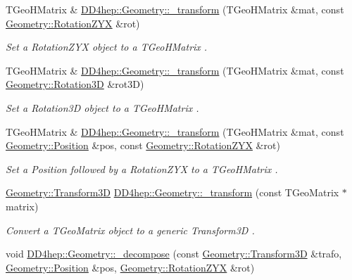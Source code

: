 \begin{DoxyCompactItemize}
T\+Geo\+H\+Matrix \& \hyperlink{group___d_d4_h_e_p___g_e_o_m_e_t_r_y_gae00745e30557512fe1da42fc705d42d1}{D\+D4hep\+::\+Geometry\+::\+\_\+transform} (T\+Geo\+H\+Matrix \&mat, const \hyperlink{namespace_d_d4hep_1_1_geometry_a24667b2b9c3cec3d5239828db4d52189}{Geometry\+::\+Rotation\+Z\+YX} \&rot)
\begin{DoxyCompactList}\small\item\em Set a Rotation\+Z\+YX object to a T\+Geo\+H\+Matrix . \end{DoxyCompactList}\item 
T\+Geo\+H\+Matrix \& \hyperlink{group___d_d4_h_e_p___g_e_o_m_e_t_r_y_ga249607824f27e539ae7a6d93d367afc6}{D\+D4hep\+::\+Geometry\+::\+\_\+transform} (T\+Geo\+H\+Matrix \&mat, const \hyperlink{namespace_d_d4hep_1_1_geometry_a022fecb763315fa2bf39cbb648944a0e}{Geometry\+::\+Rotation3D} \&rot3D)
\begin{DoxyCompactList}\small\item\em Set a Rotation3D object to a T\+Geo\+H\+Matrix . \end{DoxyCompactList}\item 
T\+Geo\+H\+Matrix \& \hyperlink{group___d_d4_h_e_p___g_e_o_m_e_t_r_y_ga71170881a8a2e3803a68f7e55d237188}{D\+D4hep\+::\+Geometry\+::\+\_\+transform} (T\+Geo\+H\+Matrix \&mat, const \hyperlink{namespace_d_d4hep_1_1_geometry_a55083902099d03506c6db01b80404900}{Geometry\+::\+Position} \&pos, const \hyperlink{namespace_d_d4hep_1_1_geometry_a24667b2b9c3cec3d5239828db4d52189}{Geometry\+::\+Rotation\+Z\+YX} \&rot)
\begin{DoxyCompactList}\small\item\em Set a Position followed by a Rotation\+Z\+YX to a T\+Geo\+H\+Matrix . \end{DoxyCompactList}\item 
\hyperlink{namespace_d_d4hep_1_1_geometry_aeb4c0356d12fd7be49a0aae50514e64b}{Geometry\+::\+Transform3D} \hyperlink{group___d_d4_h_e_p___g_e_o_m_e_t_r_y_ga7d9b7297bf0cee38d702a6e460a030a1}{D\+D4hep\+::\+Geometry\+::\+\_\+transform} (const T\+Geo\+Matrix $\ast$matrix)
\begin{DoxyCompactList}\small\item\em Convert a T\+Geo\+Matrix object to a generic Transform3D . \end{DoxyCompactList}\item 
void \hyperlink{group___d_d4_h_e_p___g_e_o_m_e_t_r_y_ga9bb962c6fc39a0f8fc76420e08d24c7a}{D\+D4hep\+::\+Geometry\+::\+\_\+decompose} (const \hyperlink{namespace_d_d4hep_1_1_geometry_aeb4c0356d12fd7be49a0aae50514e64b}{Geometry\+::\+Transform3D} \&trafo, \hyperlink{namespace_d_d4hep_1_1_geometry_a55083902099d03506c6db01b80404900}{Geometry\+::\+Position} \&pos, \hyperlink{namespace_d_d4hep_1_1_geometry_a24667b2b9c3cec3d5239828db4d52189}{Geometry\+::\+Rotation\+Z\+YX} \&rot)

\end{DoxyCompactItemize}
